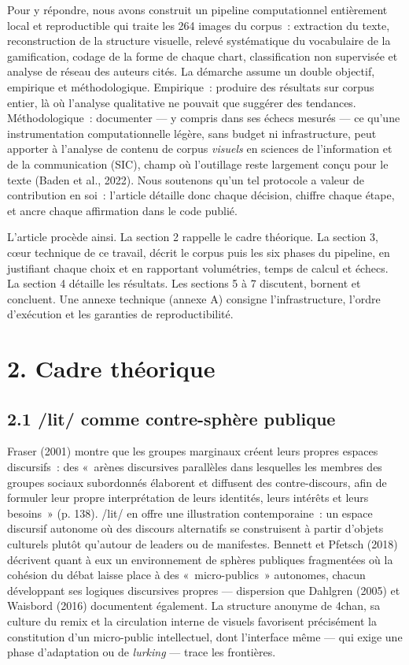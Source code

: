 \documentclass[11pt,a4paper]{article}
\begin{document}
Pour y répondre, nous avons construit un pipeline computationnel entièrement local et reproductible qui traite les 264 images du corpus~: extraction du texte, reconstruction de la structure visuelle, relevé systématique du vocabulaire de la gamification, codage de la forme de chaque chart, classification non supervisée et analyse de réseau des auteurs cités. La démarche assume un double objectif, empirique et méthodologique. Empirique~: produire des résultats sur corpus entier, là où l'analyse qualitative ne pouvait que suggérer des tendances. Méthodologique~: documenter --- y compris dans ses échecs mesurés --- ce qu'une instrumentation computationnelle légère, sans budget ni infrastructure, peut apporter à l'analyse de contenu de corpus \emph{visuels} en sciences de l'information et de la communication (SIC), champ où l'outillage reste largement conçu pour le texte (Baden et al., 2022). Nous soutenons qu'un tel protocole a valeur de contribution en soi~: l'article détaille donc chaque décision, chiffre chaque étape, et ancre chaque affirmation dans le code publié.

L'article procède ainsi. La section 2 rappelle le cadre théorique. La section 3, cœur technique de ce travail, décrit le corpus puis les six phases du pipeline, en justifiant chaque choix et en rapportant volumétries, temps de calcul et échecs. La section 4 détaille les résultats. Les sections 5 à 7 discutent, bornent et concluent. Une annexe technique (annexe A) consigne l'infrastructure, l'ordre d'exécution et les garanties de reproductibilité.

\section*{2. Cadre théorique}

\subsection*{2.1 /lit/ comme contre-sphère publique}

Fraser (2001) montre que les groupes marginaux créent leurs propres espaces discursifs~: des «~arènes discursives parallèles dans lesquelles les membres des groupes sociaux subordonnés élaborent et diffusent des contre-discours, afin de formuler leur propre interprétation de leurs identités, leurs intérêts et leurs besoins~» (p. 138). /lit/ en offre une illustration contemporaine~: un espace discursif autonome où des discours alternatifs se construisent à partir d'objets culturels plutôt qu'autour de leaders ou de manifestes. Bennett et Pfetsch (2018) décrivent quant à eux un environnement de sphères publiques fragmentées où la cohésion du débat laisse place à des «~micro-publics~» autonomes, chacun développant ses logiques discursives propres --- dispersion que Dahlgren (2005) et Waisbord (2016) documentent également. La structure anonyme de 4chan, sa culture du remix et la circulation interne de visuels favorisent précisément la constitution d'un micro-public intellectuel, dont l'interface même --- qui exige une phase d'adaptation ou de \emph{lurking} --- trace les frontières.
\end{document}
